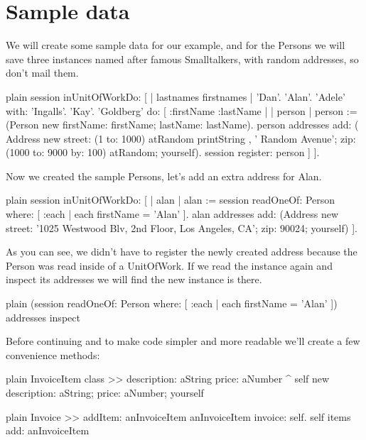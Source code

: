 \documentclass[10pt,twoside,english]{_support/latex/sbabook/sbabook}
\begin{document}
\section{Sample data}
We will create some sample data for our example, and for the Persons we will
save three instances named after famous Smalltalkers, with random addresses,
so don't mail them.

\begin{displaycode}{plain}
session inUnitOfWorkDo: [
	| lastnames firstnames |
	{ 'Dan'. 'Alan'. 'Adele' }
		with: {'Ingalls'. 'Kay'. 'Goldberg'}
		do: [ :firstName :lastName |
			| person |
			person := (Person new
				firstName: firstName;
				lastName: lastName).
			person addresses add: (
				Address new
					street: (1 to: 1000) atRandom printString
					, ' Random Avenue';
					zip: (1000 to: 9000 by: 100) atRandom;
					yourself).
			session register: person
	]
].
\end{displaycode}

Now we created the sample Persons, let's add an extra address for Alan.

\begin{displaycode}{plain}
session inUnitOfWorkDo: [
	| alan |
	alan := session
		readOneOf: Person
		where: [ :each | each firstName = 'Alan' ].
	alan addresses
		add: (Address new
			street: '1025 Westwood Blv, 2nd Floor, Los Angeles, CA';
			zip: 90024;
			yourself)
].
\end{displaycode}

As you can see, we didn't have to register the newly created address because
the Person was read inside of a UnitOfWork. If we read the instance again
and inspect its addresses we will find the new instance is there.

\begin{displaycode}{plain}
(session
	readOneOf: Person
	where: [ :each | each firstName = 'Alan' ]) addresses inspect
\end{displaycode}

Before continuing and to make code simpler and more readable we'll
create a few convenience methods:

\begin{displaycode}{plain}
InvoiceItem class >> description: aString price: aNumber
	^ self new
			description: aString;
			price: aNumber;
			yourself
\end{displaycode}

\begin{displaycode}{plain}
Invoice >> addItem: anInvoiceItem
	anInvoiceItem invoice: self.
	self items add: anInvoiceItem
\end{displaycode}
\end{document}
